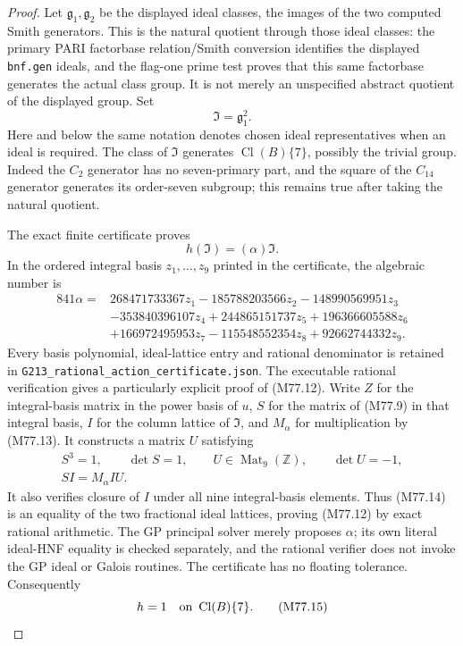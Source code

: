 \begin{proof}
Let $\mathfrak g_1,\mathfrak g_2$ be the displayed ideal
classes, the images of the two computed Smith generators.
This is the natural quotient through those ideal classes:
the primary PARI factorbase relation/Smith conversion
identifies the displayed \texttt{bnf.gen} ideals, and the
flag-one prime test proves that this same factorbase
generates the actual class group. It is not merely an
unspecified abstract quotient of the displayed group.
Set
\[
                            \mathfrak I=\mathfrak g_1^2.
 \tag{M77.11}
\]
Here and below the same notation denotes chosen ideal
representatives when an ideal is required.
The class of $\mathfrak I$ generates
$\operatorname{Cl}(B)\{7\}$, possibly the trivial group.
Indeed the $C_2$ generator has no seven-primary part,
and the square of the $C_{14}$ generator generates its
order-seven subgroup; this remains true after taking
the natural quotient.

The exact finite certificate proves
\[
                           h(\mathfrak I)=(\alpha)\mathfrak I.
 \tag{M77.12}
\]
In the ordered integral basis $z_1,\ldots,z_9$ printed
in the certificate, the algebraic number is
\[
 \begin{aligned}
 841\alpha={}&268471733367z_1-185788203566z_2
                    -148990569951z_3\\
 &-353840396107z_4+244865151737z_5+196366605588z_6\\
 &+166972495953z_7-115548552354z_8+92662744332z_9.
 \end{aligned}\tag{M77.13}
\]
Every basis polynomial, ideal-lattice entry and rational
denominator is retained in
\texttt{G213\_rational\_action\_certificate.json}.
The executable rational verification gives a particularly
explicit proof of (M77.12). Write $Z$ for the integral-basis
matrix in the power basis of $u$, $S$ for the matrix of
(M77.9) in that integral basis, $I$ for the column lattice
of $\mathfrak I$, and $M_\alpha$ for multiplication by
(M77.13). It constructs a matrix $U$ satisfying
\[
 \begin{gathered}
 S^3=1,\qquad \det S=1,\qquad
 U\in\operatorname{Mat}_9(\mathbb Z),\qquad \det U=-1,\\
                         SI=M_\alpha I U.
 \end{gathered}\tag{M77.14}
\]
It also verifies closure of $I$ under all nine integral-basis
elements. Thus (M77.14) is an equality of the two fractional
ideal lattices, proving (M77.12) by exact rational arithmetic.
The GP principal solver merely proposes $\alpha$; its own
literal ideal-HNF equality is checked separately, and the
rational verifier does not invoke the GP ideal or Galois
routines. The certificate has no floating tolerance.
Consequently
\[
                      h=1\quad\hbox{on }\operatorname{Cl}(B)\{7\}.
 \tag{M77.15}
\]


\end{proof}

